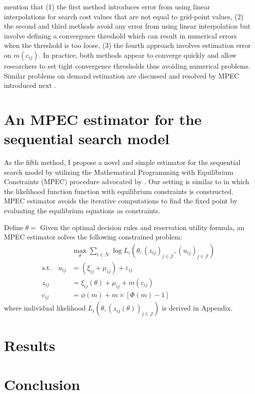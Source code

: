 \documentclass[12pt]{article}
\begin{document}
\cite{ursu2023sequential} mention that (1) the first method introduces error from using linear interpolations for search cost
values that are not equal to grid-point values, (2) the second and third methods avoid any error from using linear interpolation but involve defining a convergence threshold which can result in numerical errors when the threshold is too loose, (3) the fourth approach involves estimation error on $m(c_{ij})$. 
In practice, both methods appear to converge quickly and allow researchers to set tight convergence thresholds thus avoiding numerical problems. 
Similar problems on demand estimation are discussed and resolved by MPEC introduced next \citep{dube2012improving}. 



\section{An MPEC estimator for the sequential search model}
As the fifth method, I propose a novel and simple estimator for the sequential search model by utilizing
the Mathematical Programming with Equilibrium Constraints (MPEC) procedure advocated
by \cite{su2012constrained}. 
Our setting is similar to \cite{su2012constrained} in which the likelihood function
function with equilibrium constraints is constructed. 
MPEC estimator avoids the iterative computations to find the fixed point by evaluating the equilibrium equations as
constraints.

Define $\theta=$
Given the optimal decision rules and reservation utility formula, an MPEC estimator solves the following constrained problem:
\begin{align*}
    &\max_{\theta} \sum_{i\in \mathcal{N}} \log L_{i}(\theta,(z_{ij})_{j\in \mathcal{J}},(u_{ij})_{j\in \mathcal{J}})\\
    \text{s.t.}\quad u_{i j} & =\left(\xi_{i j}+\mu_{i j}\right)+\varepsilon_{i j}\\
    z_{i j}&=\xi_{i j}(\theta)+\mu_{i j}+m\left(c_{i j}\right) \\
    c_{i j}&=\phi(m)+m \times[\Phi(m)-1] 
\end{align*}
where individual likelihood $L_{i}(\theta,(z_{ij}(\theta))_{j\in \mathcal{J}})$ is derived in Appendix.

\section{Results}

\section{Conclusion}







\end{document}
